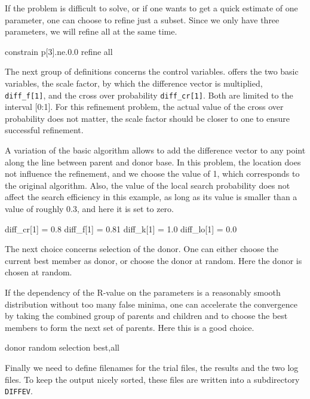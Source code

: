 If the problem is difficult to solve, or if one wants to get a quick
estimate of one parameter, one can choose to refine just a subset. 
Since we only have three parameters, we will refine all at the same
time.

\begin{MacVerbatim}
   constrain p[3].ne.0.0
   refine     all
\end{MacVerbatim}

The next group of definitions concerns the control variables. \Diffev
offers the two basic variables, the scale factor, by which the difference
vector is multiplied, {\tt diff\_f[1]}, and the cross over probability
{\tt diff\_cr[1]}. Both are limited to the interval [0:1]. For this
refinement problem, the actual value of the cross over probability does
not matter, the scale factor should be closer to one to ensure 
successful refinement.

A variation of the basic algorithm allows to add the difference vector to 
any point along the line between parent and donor base.
In this problem, the location does not influence the refinement, and 
we choose the value of 1, which corresponds to the original 
algorithm. Also, the value of the local search probability does not
affect the search efficiency in this example, as long as its value is 
smaller than a value of roughly 0.3, and here it is set to zero.

\begin{MacVerbatim}
   diff_cr[1]  = 0.8
   diff_f[1]   = 0.81
   diff_k[1]   = 1.0
   diff_lo[1]  = 0.0
\end{MacVerbatim}

The next choice concerns selection of the donor. One can either choose 
the current best member as donor, or choose the donor at random. 
Here the donor is chosen at random. 

If the dependency of the R-value on the parameters is a reasonably 
smooth distribution without too many false minima, one can accelerate 
the convergence by taking the combined group of parents and children 
and to choose the best members to form the next set of parents. 
Here this is a good choice.

\begin{MacVerbatim}
   donor      random
   selection  best,all
\end{MacVerbatim}

Finally we need to define filenames for the trial files, the results
and the two log files. To keep the output nicely sorted, these files
are written into a subdirectory {\tt DIFFEV}.

